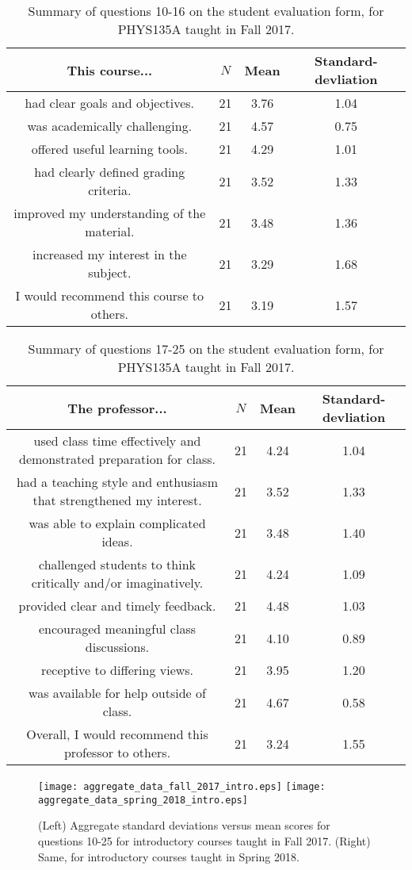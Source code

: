 \documentclass[../../main.tex]{subfiles}
\begin{document}
\begin{table}
\centering
\begin{tabular}{| c | c | c | c |}
\hline \hline
This course... & $N$ & Mean & Standard-devliation \\ \hline
had clear goals and objectives. & 21 & 3.76 & 1.04 \\ \hline
was academically challenging. & 21 & 4.57 & 0.75 \\ \hline
offered useful learning tools. & 21 & 4.29 & 1.01 \\ \hline
had clearly defined grading criteria. & 21 & 3.52 & 1.33 \\ \hline
improved my understanding of the material. & 21 & 3.48 & 1.36 \\ \hline
increased my interest in the subject. & 21 & 3.29 & 1.68 \\ \hline
I would recommend this course to others. & 21 & 3.19 & 1.57 \\ \hline
\hline
\end{tabular}
\caption{\label{tab:courses:intro_eval_1} Summary of questions 10-16 on the student evaluation form, for PHYS135A taught in Fall 2017.}
\end{table}

\begin{table}
\centering
\begin{tabular}{| c | c | c | c |}
\hline \hline
The professor... & $N$ & Mean & Standard-devliation \\ \hline
used class time effectively and demonstrated preparation for class. & 21 & 4.24 & 1.04 \\ \hline
had a teaching style and enthusiasm that strengthened my interest. & 21 & 3.52 & 1.33 \\ \hline
was able to explain complicated ideas. & 21 & 3.48 & 1.40 \\ \hline
challenged students to think critically and/or imaginatively. & 21 & 4.24 & 1.09 \\ \hline
provided clear and timely feedback. & 21 & 4.48 & 1.03 \\ \hline
encouraged meaningful class discussions. & 21 & 4.10 & 0.89 \\ \hline
receptive to differing views. & 21 & 3.95 & 1.20 \\ \hline
was available for help outside of class. & 21 & 4.67 & 0.58 \\ \hline
Overall, I would recommend this professor to others. & 21 & 3.24 & 1.55 \\ \hline
\hline
\end{tabular}
\caption{\label{tab:courses:intro_eval_2} Summary of questions 17-25 on the student evaluation form, for PHYS135A taught in Fall 2017.}
\end{table}

\begin{figure}
\centering
\texttt{[image: aggregate\_data\_fall\_2017\_intro.eps]}
\texttt{[image: aggregate\_data\_spring\_2018\_intro.eps]}
\caption{\label{fig:ag_data} (Left) Aggregate standard deviations versus mean scores for questions 10-25 for introductory courses taught in Fall 2017.  (Right) Same, for introductory courses taught in Spring 2018.}
\end{figure}
\end{document}
